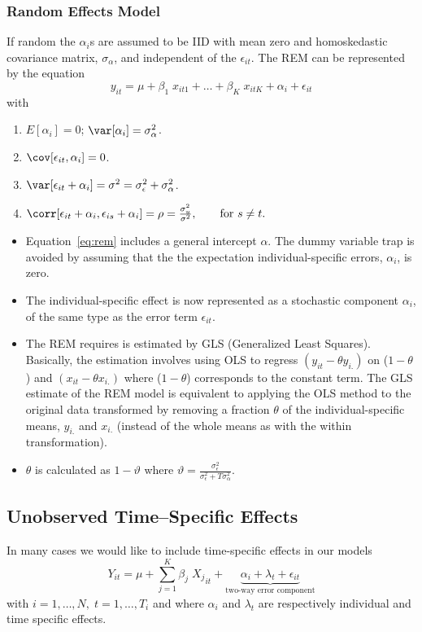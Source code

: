 \documentclass[landscape,letterpaper,9pt]{article}
\begin{document}
\subsubsection{Random Effects Model}
If  random the \(\alpha_i\)s  are assumed to be  IID with mean zero
and homoskedastic covariance matrix, \(\sigma_\alpha\), and  independent of the \(\epsilon_{it}\). 
The REM can be represented by the equation
\begin{equation}\label{eq:rem}
y_{it} =  \mu +  \beta_1 \; x_{it1} + \dots+ \beta_K \; x_{itK} + \alpha_i  +\epsilon_{it}
\end{equation}
with
\begin{enumerate}
\item \(E[\alpha_{i}] = 0\); \(\var[\alpha_{i}]= \sigma^2_\alpha\).
\item \(\cov[\epsilon_{it},\alpha_i]=0\).
\item \(\var[\epsilon_{it}+\alpha_{i}] = \sigma^2 = \sigma^2_\epsilon + \sigma^2_\alpha\).
\item \(\corr[ \epsilon_{it} +\alpha_i ,\epsilon_{is} +\alpha_i]=\rho=\frac{\sigma^2_u}{\sigma^2},
 \qquad \text{for $s \neq t$}.  \)
\end{enumerate}
\begin{itemize}
\item
Equation~\ref{eq:rem} includes a general intercept \(\alpha\). The dummy variable trap is avoided
by assuming that the the expectation individual-specific errors, \(\alpha_i\), is zero.
\item The individual-specific effect is now represented as a stochastic component  \(\alpha_i\), of the same type
as the error term \(\epsilon_{it}\).
\item The REM requires is estimated by GLS (Generalized Least Squares). Basically, the estimation involves using OLS
to regress \((y_{it} - \theta y_{i.})\) on (\(1-\theta\)) and \((x_{it} - \theta x_{i.})\)
where (\(1-\theta\)) corresponds to the constant term. The GLS estimate  of the REM model
is equivalent to applying the OLS method to the original data transformed by removing a fraction \(\theta\)
of the individual-specific means, \(y_{i.}\) and \(x_{i.}\) (instead of the whole means as with the within transformation).
\item \(\theta\) is calculated as  \(1 - \vartheta\)
where \(\vartheta = \frac{\sigma_\epsilon^2}{\sigma_\epsilon^2 + T \sigma_\alpha^2}\).
\end{itemize}
\newpage
\subsection{Unobserved Time--Specific Effects}
In many cases we would like to include time-specific effects in our models
\[
Y_{it} = \mu +
\sum_{j= 1}^{K} \beta_{j} \; {X_{j}}_{it}  +  \underbrace{\alpha_i + \lambda_t +\epsilon_{it}}_{\text{two-way error component} }
\]
with \(i=1, \ldots, N, \; t= 1, \ldots, T_i\) and where \(\alpha_i\) and \(\lambda_t\) are
respectively individual and time specific effects.
\newpage
\end{document}

